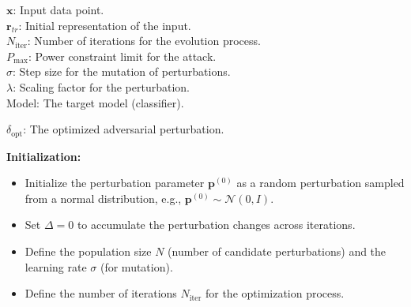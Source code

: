\(\mathbf{x}\): Input data point. \\
\(\mathbf{r}_{tr}\): Initial representation of the input. \\
\(N_{\text{iter}}\): Number of iterations for the evolution process. \\
\(P_{\text{max}}\): Power constraint limit for the attack. \\
\(\sigma\): Step size for the mutation of perturbations. \\
\(\lambda\): Scaling factor for the perturbation. \\
Model: The target model (classifier).


\(\delta_{\text{opt}}\): The optimized adversarial perturbation.


\textbf{Initialization:}
\begin{itemize}
    \item Initialize the perturbation parameter \(\mathbf{p}^{(0)}\) as a random perturbation sampled from a normal distribution, e.g., \( \mathbf{p}^{(0)} \sim \mathcal{N}(0, I) \).
    \item Set \(\Delta = 0\) to accumulate the perturbation changes across iterations.
    \item Define the population size \(N\) (number of candidate perturbations) and the learning rate \(\sigma\) (for mutation).
    \item Define the number of iterations \(N_{\text{iter}}\) for the optimization process.
\end{itemize}

